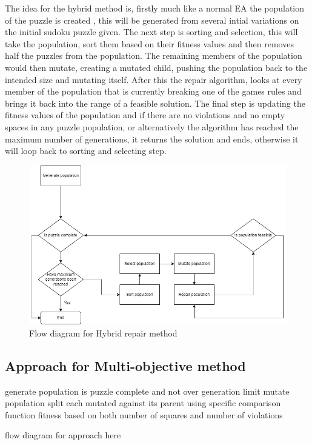 \documentclass[a4paper,11pt]{article}
\begin{document}
The idea for the hybrid method is, firstly much like a normal EA the population of the puzzle is created , this will be generated from several intial variations on the initial sudoku puzzle given. The next step is sorting and selection, this will take the population, sort them based on their fitness values and then removes half the puzzles from the population. The remaining members of the population would then mutate, creating a mutated child, pushing the population back to the intended size and mutating itself. After this the repair algorithm, looks at every member of the population that is currently breaking one of the games rules and brings it back into the range of a feasible solution. The final step is updating the fitness values of the population and if there are no violations and no empty spaces in any puzzle population, or alternatively the algorithm has reached the maximum number of generations, it returns the solution and ends, otherwise it will loop back to sorting and selecting step.

\begin{figure}[h]
	\caption{Flow diagram for Hybrid repair method}
	\includegraphics{hybridRepairFlowchart.png}
\end{figure}

\subsection{Approach for Multi-objective method}
generate population
is puzzle complete and not over generation limit
mutate population
split each mutated against its parent using specific comparison function
fitness based on both number of squares and number of violations



flow diagram for approach here
\end{document}
